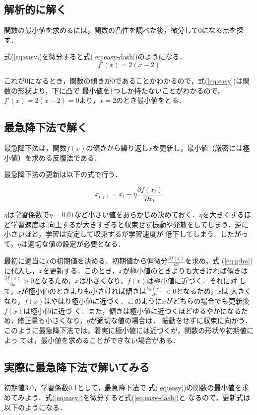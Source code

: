 \documentclass[12pt]{jsarticle}
\begin{document}
\subsection{解析的に解く}
関数の最小値を求めるには，関数の凸性を調べた後，微分して0になる点を探す．

式(\ref{eq:easy})を微分すると式(\ref{eq:easy-dash})のようになる．
\begin{equation}
  f'(x)=2(x-2)
  \label{eq:easy-dash}
\end{equation}

これが0になるとき，関数の傾きが0であることがわかるので，式(\ref{eq:easy})は関数の形状より，下に凸で
最小値を1つしか持たないことがわかるので，$f'(x)=2(x-2)=0$より，$x=2$のとき最小値をとる．

\subsection{最急降下法で解く}
最急降下法は，関数$f(x)$の傾きから繰り返し$x$を更新し，最小値（厳密には極小値）を求める反復法である．

最急降下法の更新は以下の式で行う．
	
\begin{equation}
  x_{t+1} = x_{t} - \eta \frac{\partial f(x_{t})}{\partial x_{t}}
  \label{eq:gdm}
\end{equation}
	
$\eta$は学習係数で$\eta = 0.01$など小さい値をあらかじめ決めておく．$\eta$を大きくするほど学習速度は
向上するが大きすぎると収束せず振動や発散をしてしまう．逆に小さいほど，学習は安定して収束するが学習速度が
低下してしまう．したがって，$\eta$は適切な値の設定が必要となる．

最初に適当に$x$の初期値を決める．初期値から偏微分$\frac{\partial f(x)}{\partial x}$を求め，式
(\ref{eq:gdm})に代入し，$x$を更新する．このとき，$x$が極小値のときよりも大きければ傾きは
$\frac{\partial f(x)}{\partial x} > 0$となるため，$x$は小さくなり，$f(x)$は極小値に近づく．それに対
して，$x$が極小値のときよりも小さければ傾きは$\frac{\partial f(x)}{\partial x} < 0$となるため，$x$は
大きくなり，$f(x)$はやはり極小値に近づく．このように$x$がどちらの場合でも更新後$f(x)$は極小値に近づ
く．また，傾きは極小値に近づくほどゆるやかになるため，修正量も小さくなり，$\eta$が適切な値の場合は，
振動をせずに収束に向かう．このように最急降下法では，着実に極小値には近づくが，関数の形状や初期値によっ
ては，最小値を求めることができない場合がある．

\subsection{実際に最急降下法で解いてみる}
初期値3.0，学習係数0.1として，最急降下法で
式(\ref{eq:easy})の関数の最小値を求めてみよう．式(\ref{eq:easy})を微分すると式(\ref{eq:easy-dash})と
なるので，更新式は以下のようになる．
\end{document}
